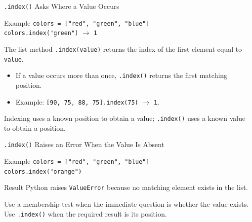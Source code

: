 \documentclass[aspectratio=169,10pt]{beamer}
\begin{document}
\begin{frame}{\texttt{.index()} Asks Where a Value Occurs}
  \begin{block}{Example}
    \texttt{colors = ["red", "green", "blue"]}\\[0.08in]
    \texttt{colors.index("green")} $\longrightarrow$ \texttt{1}
  \end{block}

  \begin{cpdefinition}
    The list method \texttt{.index(value)} returns the index of the first element equal to \texttt{value}.
  \end{cpdefinition}

  \begin{itemize}
    \item If a value occurs more than once, \texttt{.index()} returns the first matching position.
    \item Example: \texttt{[90, 75, 88, 75].index(75)} $\longrightarrow$ \texttt{1}.
  \end{itemize}

  \begin{keyidea}
    Indexing uses a known position to obtain a value; \texttt{.index()} uses a known value to obtain a position.
  \end{keyidea}
\end{frame}

\begin{frame}{\texttt{.index()} Raises an Error When the Value Is Absent}
  \begin{block}{Example}
    \texttt{colors = ["red", "green", "blue"]}\\[0.08in]
    \texttt{colors.index("orange")}
  \end{block}

  \begin{alertblock}{Result}
    Python raises \texttt{ValueError} because no matching element exists in the list.
  \end{alertblock}

  \begin{keyidea}
    Use a membership test when the immediate question is whether the value exists. Use \texttt{.index()} when the required result is its position.
  \end{keyidea}
\end{frame}
\end{document}
